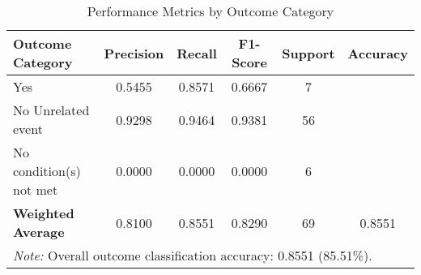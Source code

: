 \begin{table}[H]
\centering
\caption{Performance Metrics by Outcome Category}
\label{tab:classification_metrics}
\begin{tabular}{lccccc}
\toprule
\textbf{Outcome Category} & \textbf{Precision} & \textbf{Recall} & \textbf{F1-Score} & \textbf{Support} & \textbf{Accuracy} \\
\midrule
Yes & 0.5455 & 0.8571 & 0.6667 & 7 & \multirow{1}{*}{} \\
No \- Unrelated event & 0.9298 & 0.9464 & 0.9381 & 56 & \multirow{1}{*}{} \\
No \- condition(s) not met & 0.0000 & 0.0000 & 0.0000 & 6 & \multirow{1}{*}{} \\
\midrule
\textbf{Weighted Average} & 0.8100 & 0.8551 & 0.8290 & 69 & 0.8551 \\
\bottomrule
\multicolumn{6}{p{14cm}}{\textit{Note:} Overall outcome classification accuracy: 0.8551 (85.51\%).} \\
\end{tabular}
\end{table}
